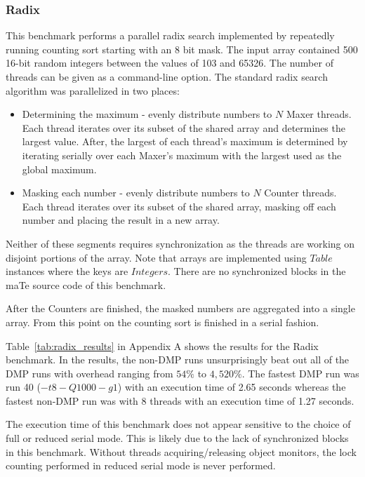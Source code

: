 \subsubsection{Radix}

This benchmark performs a parallel radix search implemented by
repeatedly running counting sort starting with an 8 bit mask.  The
input array contained 500 16-bit random integers between the values of
103 and 65326.  The number of threads can be given as a command-line
option.  The standard radix search algorithm was parallelized in two
places:

\begin{itemize}
\item Determining the maximum - evenly distribute numbers to $N$ Maxer
  threads.  Each thread iterates over its subset of the shared array
  and determines the largest value.  After, the largest of each
  thread's maximum is determined by iterating serially over each
  Maxer's maximum with the largest used as the global maximum.

\item Masking each number - evenly distribute numbers to $N$ Counter
  threads.  Each thread iterates over its subset of the shared array,
  masking off each number and placing the result in a new array.
\end{itemize}

Neither of these segments requires synchronization as the threads are
working on disjoint portions of the array.  Note that arrays are
implemented using $Table$ instances where the keys are $Integers$.
There are no synchronized blocks in the maTe source code of this
benchmark.

After the Counters are finished, the masked numbers are aggregated
into a single array.  From this point on the counting sort is finished
in a serial fashion.

Table~\ref{tab:radix_results} in Appendix A shows the results for the
Radix benchmark.  In the results, the non-DMP runs unsurprisingly beat
out all of the DMP runs with overhead ranging from $54\%$ to
$4,520\%$.  The fastest DMP run was run 40 ($-t8 -Q1000 -g1$) with an
execution time of 2.65 seconds whereas the fastest non-DMP run was
with 8 threads with an execution time of 1.27 seconds.

The execution time of this benchmark does not appear sensitive to the
choice of full or reduced serial mode.  This is likely due to the lack
of synchronized blocks in this benchmark.  Without threads
acquiring/releasing object monitors, the lock counting performed in
reduced serial mode is never performed.

